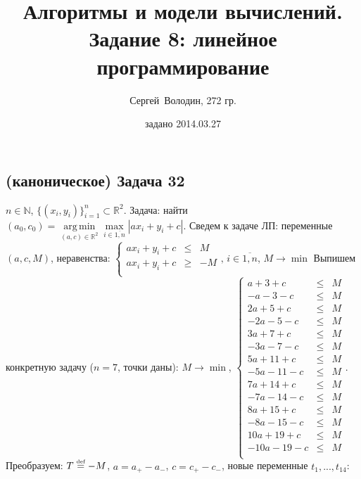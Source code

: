 \documentclass[a4paper]{article}
\date{задано 2014.03.27}
\author{Сергей~Володин, 272 гр.}
\title{Алгоритмы и модели вычислений.\\Задание 8: линейное программирование}
\DeclareMathOperator*{\argmin}{arg\,min}
\def\eqdef{\overset{\mbox{\tiny def}}{=}}
\newcommand{\NN}{\mathbb{N}}
\newcommand{\RR}{\mathbb{R}}
\begin{document}
\maketitle
\subsection*{(каноническое) Задача 32}
$n\in\NN$, $\{(x_i,y_i)\}_{i=1}^n\subset\RR^2$. Задача: найти $(a_0,c_0)=\argmin\limits_{(a,c)\in\RR^2}\max\limits_{i\in\overline{1,n}}|ax_i+y_i+c|$.\newline
Сведем к задаче ЛП: переменные $(a,c,M)$, неравенства: $\left\{\begin{array}{lcr}
ax_i+y_i+c& \leqslant &M\\
ax_i+y_i+c&\geqslant &-M\\
\end{array}\right.,\,i\in\overline{1,n}$, $M\to\min$\newline
Выпишем конкретную задачу ($n=7$, точки даны):\newline
$M\to\min$,
$\left\{\begin{array}{lcr}
a+3+c & \leqslant & M\\
-a-3-c & \leqslant & M\\

2a+5+c & \leqslant & M\\
-2a-5-c & \leqslant & M\\

3a+7+c & \leqslant & M\\
-3a-7-c & \leqslant & M\\

5a+11+c & \leqslant & M\\
-5a-11-c & \leqslant & M\\

7a+14+c & \leqslant & M\\
-7a-14-c & \leqslant & M\\

8a+15+c & \leqslant & M\\
-8a-15-c & \leqslant & M\\

10a+19+c & \leqslant & M\\
-10a-19-c & \leqslant & M\\
\end{array}\right.
$. Преобразуем: $T\eqdef -M$, $a=a_+-a_-$, $c=c_+-c_-$, новые переменные $t_1,...,t_{14}$:\newline
\end{document}
